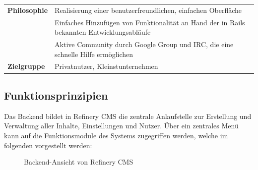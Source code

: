 \begin{table}[!h]
\begin{tabular}[!ht]{|l|l|l|}
\hline
\textbf{Philosophie} & \multicolumn{2}{p{10cm}|}{Realisierung einer benutzerfreundlichen, einfachen Oberfläche} \\
& \multicolumn{2}{p{10cm}|}{Einfaches Hinzufügen von Funktionalität an Hand der in Rails bekannten Entwicklungsabläufe}\\
& \multicolumn{2}{p{10cm}|}{Aktive Community durch Google Group und IRC, die eine schnelle Hilfe ermöglichen}\\
\hline
\textbf{Zielgruppe} & \multicolumn{2}{p{10cm}|}{Privatnutzer, Kleinstunternehmen} \\
\hline
\end{tabular}
\end{table}
\subsection{Funktionsprinzipien}
Das Backend bildet in Refinery CMS die zentrale Anlaufstelle zur Erstellung und Verwaltung aller Inhalte, Einstellungen und Nutzer. Über ein zentrales Menü kann auf die Funktionsmodule des Systems zugegriffen werden, welche im folgenden vorgestellt werden:
\begin{figure}[!h]
\begin{center}
\caption{Backend-Ansicht von Refinery CMS}
\label{refinerybackend}
\end{center}
\end{figure}

